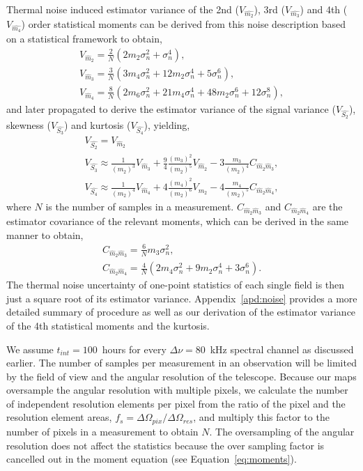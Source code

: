 \documentclass[fleqn,usenatbib]{mnras}
\begin{document}
Thermal noise induced estimator variance of the 2nd ($V_{\hat{m_2}}$), 3rd ($V_{\hat{m_3}}$) and 4th ($V_{\hat{m_4}}$) order statistical moments can be derived from this noise description based on a statistical framework to obtain,
\begin{gather}
    \label{eq:m2_var}
    V_{\hat{m}_2} = \frac{2}{N}
        (2 m_2 \sigma_n^2 + \sigma_n^4), \\
    \label{eq:m3_var}
    V_{\hat{m}_3} = \frac{3}{N}
        (3 m_4 \sigma_n^2 + 12 m_2 \sigma_n^4 
        + 5 \sigma_n^6), \\
    \label{eq:m4_var}
    V_{\hat{m}_4} = \frac{8}{N}
    (2 m_6 \sigma_n^2 + 21 m_4 \sigma_n^4
        + 48 m_2 \sigma_n^6 + 12 \sigma_n^8),
\end{gather}
and later propagated to derive the estimator variance of the signal variance ($V_{\hat{S_2}}$), skewness ($V_{\hat{S_3}}$) and kurtosis ($V_{\hat{S_4}}$), yielding,
\begin{gather}
    \label{eq:var_var}
    V_{\hat{S_2}} = V_{\hat{m}_2} \\
    \label{eq:skew_var}
    V_{\hat{S_3}} \approx \frac{1}{(m_2)^3}V_{\hat{m}_3}
        + \frac{9}{4}\frac{(m_3)^2}{(m_2)^5}V_{\hat{m}_2}
        - 3\frac{m_3}{(m_2)^4}C_{\hat{m}_2\hat{m}_3}, \\
    \label{eq:kurt_var}
    V_{\hat{S_4}} \approx \frac{1}{(m_2)^4} V_{\hat{m}_4}
        + 4 \frac{(m_4)^2}{(m_2)^6} V_{\hat{m}_2} - 4 \frac{m_4}{(m_2)^5} C_{\hat{m}_2\hat{m}_4},
    \end{gather}
where $N$ is the number of samples in a measurement. $C_{\hat{m}_2\hat{m}_3}$ and $C_{\hat{m}_2\hat{m}_4}$ are the estimator covariance of the relevant moments, which can be derived in the same manner to obtain,
\begin{gather}
    C_{\hat{m}_2\hat{m}_3} = \frac{6}{N}m_3\sigma_n^2, \\
    C_{\hat{m}_2\hat{m}_4} = \frac{4}{N}
        (2 m_4 \sigma_n^2 + 9 m_2 \sigma_n^4
        + 3 \sigma_n^6).
\end{gather}
The thermal noise uncertainty of one-point statistics of each single field is then just a square root of its estimator variance. Appendix~\ref{apd:noise} provides a more detailed summary of \citet{Watkinson:2014jv} procedure as well as our derivation of the estimator variance of the 4th statistical moments and the kurtosis.

We assume $t_{int}=100$~hours for every $\Delta\nu=80$~kHz spectral channel as discussed earlier. The number of samples per measurement in an observation will be limited by the field of view and the angular resolution of the telescope. Because our maps oversample the angular resolution with multiple pixels, we calculate the number of independent resolution elements per pixel from the ratio of the pixel and the resolution element areas, $f_{s}=\Delta\Omega_{pix} / \Delta\Omega_{res}$, and multiply this factor to the number of pixels in a measurement to obtain $N$. The oversampling of the angular resolution does not affect the statistics because the over sampling factor is cancelled out in the moment equation (see Equation~\ref{eq:moments}).
\end{document}
